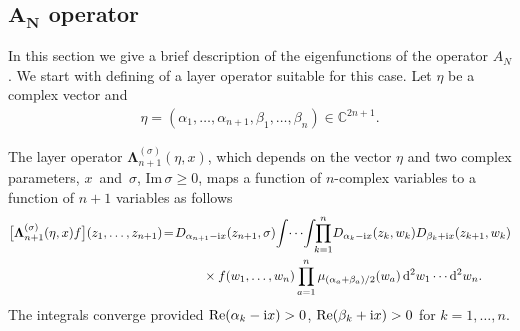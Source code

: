 \documentclass[pdftex]{sigma}%
\numberwithin{equation}{section}
\begin{document}
\subsection[AN operator]{$\boldsymbol{A_N}$ operator}%

In this section we give a brief description of the eigenfunctions of the operator $A_N$. We start with defining of a layer operator
suitable for this case. Let $\eta$ be a complex vector and
\begin{gather}\label{gamma-A}
\eta=(\alpha_1,\dots,\alpha_{n+1},\beta_{1},\dots,\beta_n) \in \mathbb C^{2n+1} .
\end{gather}
{\samepage
The layer operator $\boldsymbol \Lambda_{n+1}^{(\sigma)}(\eta,x)$, which depends on the vector $\eta$ and two complex parameters, $x$~and~$\sigma$, $\textrm{Im}\,\sigma\geq 0$, maps a function of $n$-complex variables to a function of $n+1$ variables as follows
\begin{gather}
\big[\boldsymbol\Lambda^{(\sigma)}_{n+1}(\eta,x) f\big](z_1,\dots,z_{n+1}) \!=\!D_{\alpha_{n+1}-{\rm i}x}(z_{n+1},\sigma)\!\int\! \cdots\!\int\!\!
\prod_{k=1}^{n}\! D_{\alpha_k-{\rm i}x}(z_k,w_k) D_{\beta_{k}+{\rm i}x}(z_{k+1},w_k)\notag
\\ \hphantom{\big[\boldsymbol\Lambda^{(\sigma)}_{n+1}(\eta,x) f\big](z_1,\dots,z_{n+1}) \!=}
{}\times f(w_1,\dots,w_{n}) \prod_{a=1}^n
\mu_{{(\alpha_a+\beta_{a})}/2}(w_a)
\, {\rm d}^2w_1\cdots {\rm d}^2w_n.\label{Lambda-A}
\end{gather}
The integrals converge provided $\mathop{\rm Re}(\alpha_k-{\rm i}x)>0$,
$\mathop{\rm Re}(\beta_{k}+{\rm i}x)>0$ for $k=1,\dots,n$.

}
\end{document}
